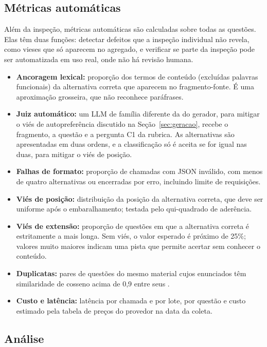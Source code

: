 \subsection{Métricas automáticas}

Além da inspeção, métricas automáticas são calculadas sobre todas as questões. Elas têm duas funções: detectar defeitos que a inspeção individual não revela, como vieses que só aparecem no agregado, e verificar se parte da inspeção pode ser automatizada em uso real, onde não há revisão humana.

\begin{itemize}
  \item \textbf{Ancoragem lexical:} proporção dos termos de conteúdo (excluídas palavras funcionais) da alternativa correta que aparecem no fragmento-fonte. É uma aproximação grosseira, que não reconhece paráfrases.
  \item \textbf{Juiz automático:} um LLM de família diferente da do gerador, para mitigar o viés de autopreferência discutido na Seção~\ref{sec:geracao}, recebe o fragmento, a questão e a pergunta C1 da rubrica. As alternativas são apresentadas em duas ordens, e a classificação só é aceita se for igual nas duas, para mitigar o viés de posição. 
  \item \textbf{Falhas de formato:} proporção de chamadas com JSON inválido, com menos de quatro alternativas ou encerradas por erro, incluindo limite de requisições.
  \item \textbf{Viés de posição:} distribuição da posição da alternativa correta, que deve ser uniforme após o embaralhamento; testada pelo qui-quadrado de aderência.
  \item \textbf{Viés de extensão:} proporção de questões em que a alternativa correta é estritamente a mais longa. Sem viés, o valor esperado é próximo de 25\%; valores muito maiores indicam uma pista que permite acertar sem conhecer o conteúdo.
  \item \textbf{Duplicatas:} pares de questões do mesmo material cujos enunciados têm similaridade de cosseno acima de 0,9 entre seus .
  \item \textbf{Custo e latência:} latência por chamada e por lote,  por questão e custo estimado pela tabela de preços do provedor na data da coleta.
\end{itemize}

\subsection{Análise}

